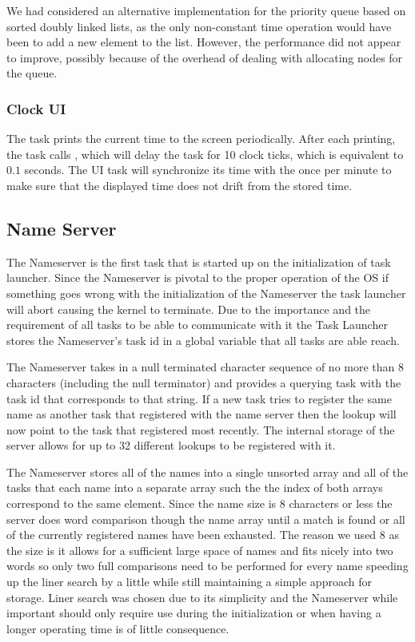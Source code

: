 \documentclass[pdftex,10pt,a4paper]{article}
\begin{document}
We had considered an alternative implementation for the priority queue
based on sorted doubly linked lists, as the only non-constant time
operation would have been to add a new element to the list. However,
the performance did not appear to improve, possibly because of the
overhead of dealing with allocating nodes for the queue.

\subsubsection*{Clock UI}

The  task prints the current time to the screen
periodically. After each printing, the task calls ,
which will delay the task for 10 clock ticks, which is equivalent to
$0.1$ seconds. The UI task will synchronize its time with the
 once per minute to make sure that the displayed
time does not drift from the stored time.


\subsection*{Name Server}

The Nameserver is the first task that is started up on the
initialization of task launcher. Since the Nameserver is pivotal to
the proper operation of the OS if something goes wrong with the
initialization of the Nameserver the task launcher will abort causing
the kernel to terminate. Due to the importance and the requirement of
all tasks to be able to communicate with it the Task Launcher stores
the Nameserver’s task id in a global variable that all tasks are able
reach.

The Nameserver takes in a null terminated character sequence of no
more than 8 characters (including the null terminator) and provides a
querying task with the task id that corresponds to that string. If a
new task tries to register the same name as another task that
registered with the name server then the lookup will now point to the
task that registered most recently. The internal storage of the server
allows for up to 32 different lookups to be registered with it.

The Nameserver stores all of the names into a single unsorted array
and all of the tasks that each name into a separate array such the the
index of both arrays correspond to the same element. Since the name
size is 8 characters or less the server does word comparison though
the name array until a match is found or all of the currently
registered names have been exhausted. The reason we used 8 as the size
is it allows for a sufficient large space of names and fits nicely
into two words so only two full comparisons need to be performed for
every name speeding up the liner search by a little while still
maintaining a simple approach for storage. Liner search was chosen due
to its simplicity and the Nameserver while important should only
require use during the initialization or when having a longer
operating time is of little consequence.
\end{document}
